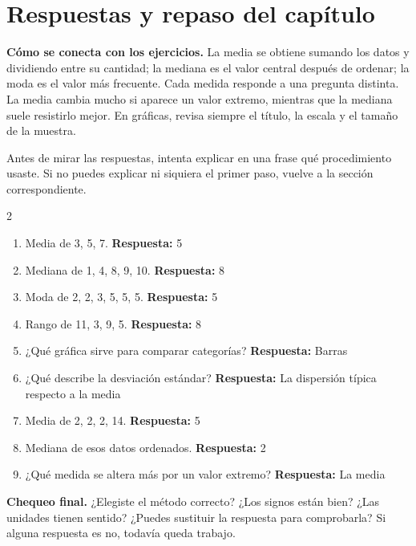 \documentclass[10pt,oneside,openany]{book}
\begin{document}
\section{Respuestas y repaso del capítulo}

\textbf{Cómo se conecta con los ejercicios.} La media se obtiene sumando los datos y dividiendo entre su cantidad; la mediana es el valor central después de ordenar; la moda es el valor más frecuente. Cada medida responde a una pregunta distinta. La media cambia mucho si aparece un valor extremo, mientras que la mediana suele resistirlo mejor. En gráficas, revisa siempre el título, la escala y el tamaño de la muestra.

Antes de mirar las respuestas, intenta explicar en una frase qué procedimiento usaste. Si no puedes explicar ni siquiera el primer paso, vuelve a la sección correspondiente.

\begin{multicols}{2}\begin{enumerate}

\item Media de 3, 5, 7. \textbf{Respuesta:} 5

\item Mediana de 1, 4, 8, 9, 10. \textbf{Respuesta:} 8

\item Moda de 2, 2, 3, 5, 5, 5. \textbf{Respuesta:} 5

\item Rango de 11, 3, 9, 5. \textbf{Respuesta:} 8

\item ¿Qué gráfica sirve para comparar categorías? \textbf{Respuesta:} Barras

\item ¿Qué describe la desviación estándar? \textbf{Respuesta:} La dispersión típica respecto a la media

\item Media de 2, 2, 2, 14. \textbf{Respuesta:} 5

\item Mediana de esos datos ordenados. \textbf{Respuesta:} 2

\item ¿Qué medida se altera más por un valor extremo? \textbf{Respuesta:} La media

\end{enumerate}\end{multicols}

\begin{idea}\textbf{Chequeo final.} ¿Elegiste el método correcto? ¿Los signos están bien? ¿Las unidades tienen sentido? ¿Puedes sustituir la respuesta para comprobarla? Si alguna respuesta es no, todavía queda trabajo.\end{idea}
\end{document}
